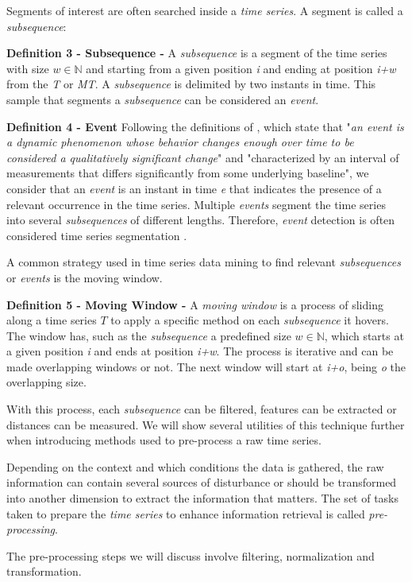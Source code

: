 Segments of interest are often searched inside a \textit{time series}. A segment is called a \textit{subsequence}:
    
    \item \textbf{Definition 3 - Subsequence - } A \textit{subsequence} is a segment of the time series with size $w \in \mathbb{N}$ and starting from a given position \textit{i} and ending at position \textit{i+w} from the \textit{T} or \textit{MT}. A \textit{subsequence} is delimited by two instants in time. This sample that segments a \textit{subsequence} can be considered an \textit{event}.   
    
    \item \textbf{Definition 4 - Event} Following the definitions of \cite{event_def1, event_def2}, which state that "\textit{an event is a dynamic phenomenon whose behavior changes enough over time to be considered a qualitatively significant change}" and "characterized by an interval of measurements that differs significantly from some underlying baseline", we consider that an \textit{event} is an instant in time \textit{e} that indicates the presence of a relevant occurrence in the time series. Multiple \textit{events} segment the time series into several \textit{subsequences} of different lengths. Therefore, \textit{event} detection is often considered time series segmentation \cite{cpd_alan}.
    
A common strategy used in time series data mining to find relevant \textit{subsequences} or \textit{events} is  the moving window. 

    \item \textbf{Definition 5 - Moving Window - } A \textit{moving window} is a process of sliding along a time series $T$ to apply a specific method on each \textit{subsequence} it hovers. The window has, such as the \textit{subsequence} a predefined size $w \in \mathbb{N}$, which starts at a given position \textit{i} and ends at position \textit{i+w}. The process is iterative and can be made overlapping windows or not. The next window will start at \textit{i+o}, being \textit{o} the overlapping size.

    



With this process, each \textit{subsequence} can be filtered, features can be extracted or distances can be measured. We will show several utilities of this technique further when introducing methods used to pre-process a raw time series.
\par
Depending on the context and which conditions the data is gathered, the raw information can contain several sources of disturbance or should be transformed into another dimension to extract the information that matters. The set of tasks taken to prepare the \textit{time series} to enhance information retrieval is called \textit{pre-processing}.
\par
The pre-processing steps we will discuss involve filtering, normalization and transformation.

